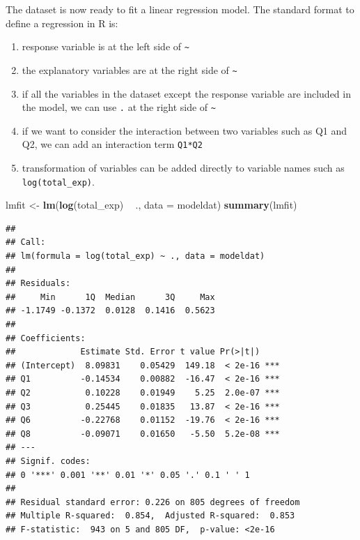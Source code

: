 \documentclass[12pt,]{krantz}
\makeatletter
\newenvironment{Shaded}{\begin{snugshade}}{\end{snugshade}}
\newcommand{\DataTypeTok}[1]{\textcolor[rgb]{0.27,0.27,0.27}{#1}}
\newcommand{\KeywordTok}[1]{\textcolor[rgb]{0.27,0.27,0.27}{\textbf{#1}}}
\newcommand{\NormalTok}[1]{#1}
\newcommand{\OperatorTok}[1]{\textcolor[rgb]{0.43,0.43,0.43}{\textbf{#1}}}
\newcommand{\StringTok}[1]{\textcolor[rgb]{0.5,0.5,0.5}{#1}}
\newenvironment{kframe}{%
\medskip{}
\setlength{\fboxsep}{.8em}
 \def\at@end@of@kframe{}%
 \ifinner\ifhmode%
  \def\at@end@of@kframe{\end{minipage}}%
  \begin{minipage}{\columnwidth}%
 \fi\fi%
 \def\FrameCommand##1{\hskip\@totalleftmargin \hskip-\fboxsep
 \colorbox{shadecolor}{##1}\hskip-\fboxsep
     \hskip-\linewidth \hskip-\@totalleftmargin \hskip\columnwidth}%
 \MakeFramed {\advance\hsize-\width
   \@totalleftmargin\z@ \linewidth\hsize
   \@setminipage}}%
 {\par\unskip\endMakeFramed%
 \at@end@of@kframe}
\renewenvironment{Shaded}{\begin{kframe}}{\end{kframe}}
\makeatother
\begin{document}
The dataset is now ready to fit a linear regression model. The standard format to define a regression in R is:

\begin{enumerate}
\def\labelenumi{(\arabic{enumi})}
\item
  response variable is at the left side of \texttt{\textasciitilde{}}
\item
  the explanatory variables are at the right side of \texttt{\textasciitilde{}}
\item
  if all the variables in the dataset except the response variable are included in the model, we can use \texttt{.} at the right side of \texttt{\textasciitilde{}}
\item
  if we want to consider the interaction between two variables such as Q1 and Q2, we can add an interaction term \texttt{Q1*Q2}
\item
  transformation of variables can be added directly to variable names such as \texttt{log(total\_exp)}.
\end{enumerate}

\begin{Shaded}
\begin{Highlighting}[]
\NormalTok{lmfit <-}\StringTok{ }\KeywordTok{lm}\NormalTok{(}\KeywordTok{log}\NormalTok{(total_exp) }\OperatorTok{~}\StringTok{ }\NormalTok{., }\DataTypeTok{data =}\NormalTok{ modeldat)}
\KeywordTok{summary}\NormalTok{(lmfit)}
\end{Highlighting}
\end{Shaded}

\begin{verbatim}
## 
## Call:
## lm(formula = log(total_exp) ~ ., data = modeldat)
## 
## Residuals:
##     Min      1Q  Median      3Q     Max 
## -1.1749 -0.1372  0.0128  0.1416  0.5623 
## 
## Coefficients:
##             Estimate Std. Error t value Pr(>|t|)    
## (Intercept)  8.09831    0.05429  149.18  < 2e-16 ***
## Q1          -0.14534    0.00882  -16.47  < 2e-16 ***
## Q2           0.10228    0.01949    5.25  2.0e-07 ***
## Q3           0.25445    0.01835   13.87  < 2e-16 ***
## Q6          -0.22768    0.01152  -19.76  < 2e-16 ***
## Q8          -0.09071    0.01650   -5.50  5.2e-08 ***
## ---
## Signif. codes:  
## 0 '***' 0.001 '**' 0.01 '*' 0.05 '.' 0.1 ' ' 1
## 
## Residual standard error: 0.226 on 805 degrees of freedom
## Multiple R-squared:  0.854,	Adjusted R-squared:  0.853 
## F-statistic:  943 on 5 and 805 DF,  p-value: <2e-16
\end{verbatim}
\end{document}
